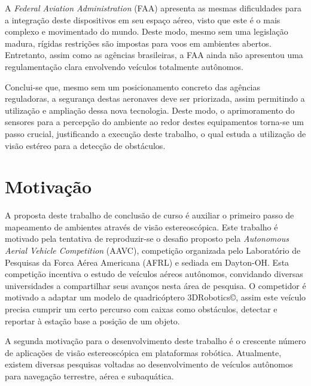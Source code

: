 A \textit{Federal Aviation Administration} (FAA) apresenta as mesmas dificuldades para a integração deste dispositivos em seu espaço aéreo, visto que este é o mais complexo e movimentado do mundo. Deste modo, mesmo sem uma legislação madura, rígidas restrições são impostas para voos em ambientes abertos. Entretanto, assim como as agências brasileiras, a FAA ainda não apresentou uma regulamentação clara envolvendo veículos totalmente autônomos. 

Conclui-se que, mesmo sem um posicionamento concreto das agências reguladoras, a segurança destas aeronaves deve ser priorizada, assim permitindo a utilização e ampliação dessa nova tecnologia. Deste modo, o aprimoramento do sensores para a percepção do ambiente ao redor destes equipamentos torna-se um passo crucial, justificando a execução deste trabalho, o qual estuda a utilização de visão estéreo para a detecção de obstáculos.

\section{Motivação}

A proposta deste trabalho de conclusão de curso é auxiliar o primeiro passo de mapeamento de ambientes através de visão estereoscópica. Este trabalho é motivado pela tentativa de reproduzir-se o desafio proposto pela \textit{Autonomous Aerial Vehicle Competition} (AAVC)\cite{AAVC}, competição organizada pelo Laboratório de Pesquisas da Forca Aérea Americana (AFRL) e sediada em Dayton-OH. Esta competição incentiva o estudo de veículos aéreos autônomos, convidando diversas universidades a compartilhar seus avanços nesta área de pesquisa. O competidor é motivado a adaptar um modelo de quadricóptero 3DRobotics©, assim este veículo precisa cumprir um certo percurso com caixas como obstáculos, detectar e reportar à estação base a posição de um objeto.

A segunda motivação para o desenvolvimento deste trabalho é o crescente número de aplicações de visão estereoscópica em plataformas robótica. Atualmente, existem diversas pesquisas voltadas ao desenvolvimento de veículos autônomos para navegação terrestre, aérea e subaquática.


